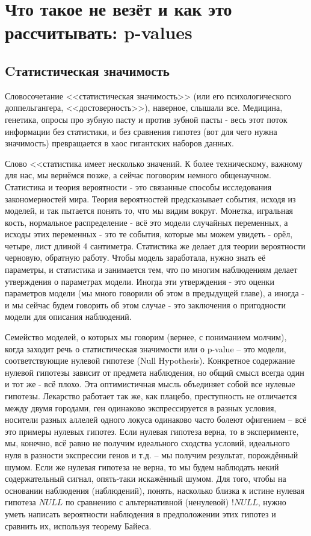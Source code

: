 \documentclass{book}
\begin{document}
 

\chapter[Что такое не везёт: p-values]{Что такое не везёт и как это рассчитывать: p-values}

\section*{Cтатистическая значимость}

Словосочетание <<статистическая значимость>> (или его психологического доппельгангера, <<достоверность>>), наверное, слышали все. Медицина, генетика, опросы про зубную пасту и против зубной пасты - весь этот поток информации без статистики, и без сравнения гипотез (вот для чего нужна значимость) превращается в хаос гигантских наборов данных.

Слово <<статистика имеет несколько значений. К более техническому, важному для нас, мы вернёмся позже, а сейчас поговорим немного общенаучном. Статистика и теория вероятности - это связанные способы исследования закономерностей мира. Теория вероятностей предсказывает события, исходя из моделей, и так пытается понять то, что мы видим вокруг. Монетка, игральная кость, нормальное распределение - всё это модели случайных переменных, а исходы этих переменных - это те события, которые мы можем увидеть - орёл, четыре, лист длиной 4 сантиметра. Статистика же делает для теории вероятности черновую, обратную работу. Чтобы модель заработала, нужно знать её параметры, и статистика и занимается тем, что по многим наблюдениям делает утверждения о параметрах модели. Иногда эти утверждения - это оценки параметров модели (мы много говорили об этом в предыдущей главе), а иногда - и мы сейчас будем говорить об этом случае - это заключения о пригодности модели для описания наблюдений.

Семейство моделей, о которых мы говорим (вернее, с пониманием молчим), когда заходит речь о статистическая значимости или о p-value -- это модели, соответствующие нулевой гипотезе (Null Hypothesis). Конкретное содержание нулевой гипотезы зависит от предмета наблюдения, но общий смысл всегда один и тот же - всё плохо. Эта оптимистичная мысль объединяет собой все нулевые гипотезы. Лекарство работает так же, как плацебо, преступность не отличается между двумя городами, ген одинаково экспрессируется в разных условия, носители разных аллелей одного локуса одинаково часто болеют офигением -- всё это примеры нулевых гипотез. Если нулевая гипотеза верна, то в эксперименте, мы, конечно, всё равно не получим идеального сходства условий, идеального нуля в разности экспрессии генов и т.д. -- мы получим результат, порождённый шумом. Если же нулевая гипотеза не верна, то мы будем наблюдать некий содержательный сигнал, опять-таки искажённый шумом. Для того, чтобы на основании наблюдения (наблюдений), понять, насколько близка к истине нулевая гипотеза $NULL$ по сравнению с альтернативной (ненулевой) $!NULL$, нужно уметь написать вероятности наблюдения в предположении этих гипотез и сравнить их, используя теорему Байеса. 
\end{document}
